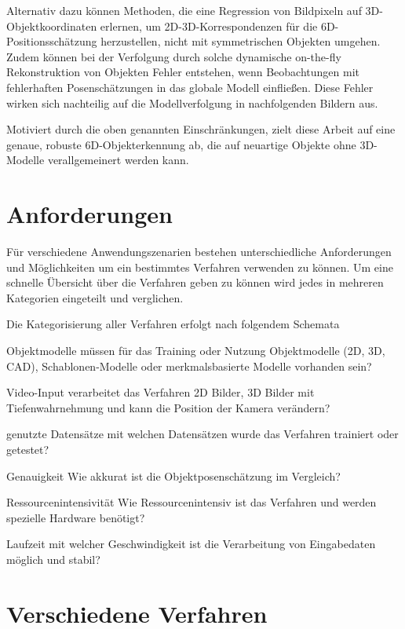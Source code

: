 \documentclass[a4paper, 11pt]{article}
\begin{document}
\begin{multicols*}{2}
    Alternativ dazu können Methoden, die eine Regression von Bildpixeln auf 3D-Objektkoordinaten erlernen, um 2D-3D-Korrespondenzen für die 6D-Positionsschätzung herzustellen, nicht mit symmetrischen Objekten umgehen. Zudem können bei der Verfolgung durch solche dynamische on-the-fly Rekonstruktion von Objekten Fehler entstehen, wenn Beobachtungen mit fehlerhaften Posenschätzungen in das globale Modell einfließen. Diese Fehler wirken sich nachteilig auf die Modellverfolgung in nachfolgenden Bildern aus.

    Motiviert durch die oben genannten Einschränkungen, zielt diese Arbeit auf eine genaue, robuste 6D-Objekterkennung ab, die auf neuartige Objekte ohne 3D-Modelle verallgemeinert werden kann.

    \section{Anforderungen}
    Für verschiedene Anwendungszenarien bestehen unterschiedliche Anforderungen und Möglichkeiten um ein bestimmtes Verfahren verwenden zu können. Um eine schnelle Übersicht über die Verfahren geben zu können wird jedes in mehreren Kategorien eingeteilt und verglichen.

    Die Kategorisierung aller Verfahren erfolgt nach folgendem Schemata
    \begin{description*}
        \item[Objektmodelle] müssen für das Training oder Nutzung Objektmodelle (2D, 3D, CAD), Schablonen-Modelle oder merkmalsbasierte Modelle vorhanden sein?
        \item[Video-Input] verarbeitet das Verfahren 2D Bilder, 3D Bilder mit Tiefenwahrnehmung und kann die Position der Kamera verändern?
        \item[genutzte Datensätze] mit welchen Datensätzen wurde das Verfahren trainiert oder getestet?
        \item[Genauigkeit] Wie akkurat ist die Objektposenschätzung im Vergleich?
        \item[Ressourcenintensivität] Wie Ressourcenintensiv ist das Verfahren und werden spezielle Hardware benötigt?
        \item[Laufzeit] mit welcher Geschwindigkeit ist die Verarbeitung von Eingabedaten möglich und stabil?
    \end{description*}

    \section{Verschiedene Verfahren}

\end{multicols*}
\end{document}
